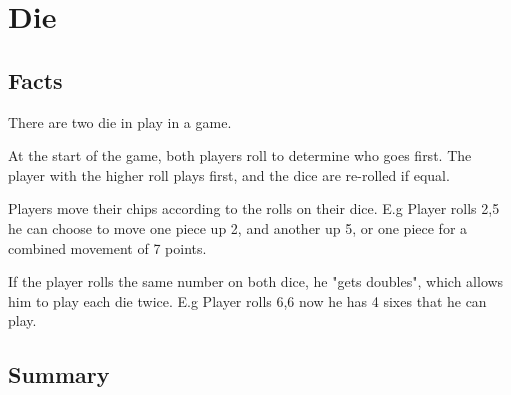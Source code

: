 \section{Die}

\subsection{Facts}

\begin{dashed}
    \item There are two die in play in a game.
    \item At the start of the game, both players roll to determine who goes first.
        The player with the higher roll plays first, and the dice are re-rolled if equal.
    \item Players move their chips according to the rolls on their dice.
        E.g Player rolls 2,5 he can choose to move one piece up 2, and another up 5,
        or one piece for a combined movement of 7 points.
    \item If the player rolls the same number on both dice, he "gets doubles", which
        allows him to play each die twice.
        E.g Player rolls 6,6 now he has 4 sixes that he can play.
    \item
\end{dashed}

\subsection{Summary}


